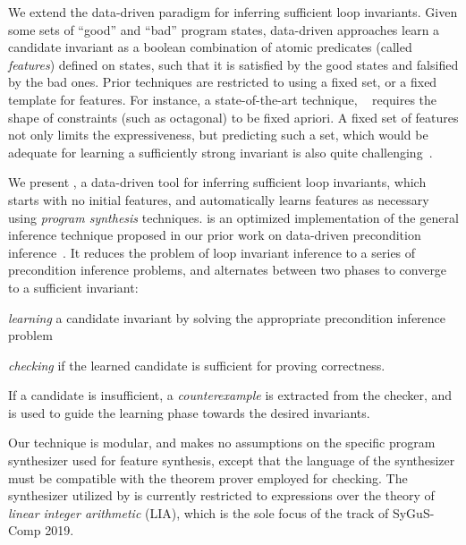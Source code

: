 \documentclass[conference]{IEEEtran}
\begin{document}
We extend the data-driven paradigm for inferring sufficient loop invariants.
Given some sets of ``good'' and ``bad'' program states,
data-driven approaches learn a candidate invariant as a boolean combination of atomic predicates (called \emph{features})
defined on states, such that it is satisfied by the good states and falsified by the bad ones.
Prior techniques are restricted to using a fixed set, or a fixed template for features.
For instance, a state-of-the-art technique, \ICEDT~\citep{Garg2016LearningIU}
requires the shape of constraints (such as octagonal) to be fixed apriori.
A fixed set of features not only limits the expressiveness, but predicting such a set,
which would be adequate for learning a sufficiently strong invariant is also quite challenging~\citep{Padhi2016DatadrivenPI}.

We present \LoopInvGen, a data-driven tool for inferring sufficient loop invariants,
which starts with no initial features, and automatically learns features as necessary using \emph{program synthesis} techniques.
\LoopInvGen is an optimized implementation of the general inference technique proposed in our prior work
on data-driven precondition inference~\citep{Padhi2016DatadrivenPI}.
It reduces the problem of loop invariant inference to a series of precondition inference problems,
and alternates between two phases to converge to a sufficient invariant:
\begin{andlist}
    \item \emph{learning} a candidate invariant by solving the appropriate precondition inference problem
    \item \emph{checking} if the learned candidate is sufficient for proving correctness.
\end{andlist}
If a candidate is insufficient, a \emph{counterexample} is extracted from the checker,
and is used to guide the learning phase towards the desired invariants.



Our technique is modular, and makes no assumptions on the specific program synthesizer used for feature synthesis,
except that the language of the synthesizer must be compatible with the theorem prover employed for checking.
The synthesizer utilized by \LoopInvGen is currently restricted to expressions over the theory of
\emph{linear integer arithmetic} (LIA), which is the sole focus of the \INV track of SyGuS-Comp 2019.
\end{document}
